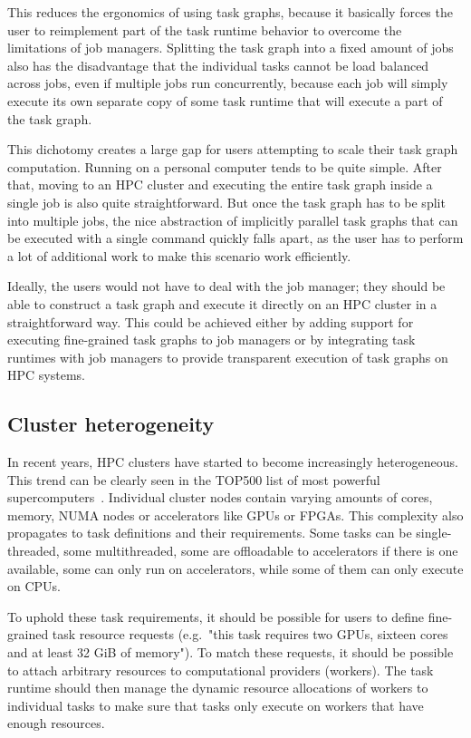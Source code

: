 \begin{description}
    This reduces the ergonomics of using task graphs, because it basically forces the user to
    reimplement part of the task runtime behavior to overcome the limitations of job managers.
    Splitting the task graph into a fixed amount of jobs also has the disadvantage that the
    individual tasks cannot be load balanced across jobs, even if multiple jobs run
    concurrently, because each job will simply execute its own separate copy of some task
    runtime that will execute a part of the task graph.
\end{description}

This dichotomy creates a large gap for users attempting to scale their task graph
computation. Running on a personal computer tends to be quite simple. After that, moving to an
HPC cluster and executing the entire task graph inside a single job is also quite
straightforward. But once the task graph has to be split into multiple jobs, the nice
abstraction of implicitly parallel task graphs that can be executed with a single command
quickly falls apart, as the user has to perform a lot of additional work to make this scenario
work efficiently.

Ideally, the users would not have to deal with the job manager; they should be
able to construct a task graph and execute it directly on an HPC cluster in a straightforward
way. This could be achieved either by adding support for executing fine-grained task graphs to
job managers or by integrating task runtimes with job managers to provide transparent execution
of task graphs on HPC systems.

\subsection{Cluster heterogeneity}
In recent years, HPC clusters have started to become increasingly heterogeneous. This trend can
be clearly seen in the TOP500 list of most powerful supercomputers~\cite{top500analysis}.
Individual cluster nodes contain varying amounts of cores, memory, NUMA nodes or accelerators
like GPUs or FPGAs. This complexity also propagates to task definitions and their requirements.
Some tasks can be single-threaded, some multithreaded, some are offloadable to accelerators if
there is one available, some can only run on accelerators, while some of them can only execute
on CPUs.

To uphold these task requirements, it should be possible for users to define fine-grained
task resource requests (e.g.\ "this task requires two GPUs, sixteen cores and at least 32 GiB of
memory"). To match these requests, it should be possible to attach arbitrary resources to
computational providers (workers). The task runtime should then manage the dynamic resource
allocations of workers to individual tasks to make sure that tasks only execute on workers that
have enough resources.

